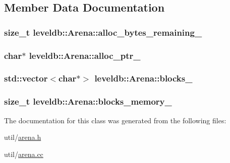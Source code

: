 \subsection{Member Data Documentation}
\hypertarget{classleveldb_1_1_arena_a420bcdcf5af6bdc48e279cb81766664b}{
\subsubsection[{alloc\-\_\-bytes\-\_\-remaining\-\_\-}]{\setlength{\rightskip}{0pt plus 5cm}size\-\_\-t leveldb\-::\-Arena\-::alloc\-\_\-bytes\-\_\-remaining\-\_\-\hspace{0.3cm}{\ttfamily [private]}}}\label{classleveldb_1_1_arena_a420bcdcf5af6bdc48e279cb81766664b}
\hypertarget{classleveldb_1_1_arena_ac2fcfb7ce7f511f431ac5c900bacb16c}{
\subsubsection[{alloc\-\_\-ptr\-\_\-}]{\setlength{\rightskip}{0pt plus 5cm}char$\ast$ leveldb\-::\-Arena\-::alloc\-\_\-ptr\-\_\-\hspace{0.3cm}{\ttfamily [private]}}}\label{classleveldb_1_1_arena_ac2fcfb7ce7f511f431ac5c900bacb16c}
\hypertarget{classleveldb_1_1_arena_a7b1488a669cd4d8e7ef6dfa04cc0e267}{
\subsubsection[{blocks\-\_\-}]{\setlength{\rightskip}{0pt plus 5cm}std\-::vector$<$char$\ast$$>$ leveldb\-::\-Arena\-::blocks\-\_\-\hspace{0.3cm}{\ttfamily [private]}}}\label{classleveldb_1_1_arena_a7b1488a669cd4d8e7ef6dfa04cc0e267}
\hypertarget{classleveldb_1_1_arena_a9f79fd19ba98968cd89bbd9097848f22}{
\subsubsection[{blocks\-\_\-memory\-\_\-}]{\setlength{\rightskip}{0pt plus 5cm}size\-\_\-t leveldb\-::\-Arena\-::blocks\-\_\-memory\-\_\-\hspace{0.3cm}{\ttfamily [private]}}}\label{classleveldb_1_1_arena_a9f79fd19ba98968cd89bbd9097848f22}


The documentation for this class was generated from the following files\-:\begin{DoxyCompactItemize}
\item 
util/\hyperlink{arena_8h}{arena.\-h}\item 
util/\hyperlink{arena_8cc}{arena.\-cc}\end{DoxyCompactItemize}
